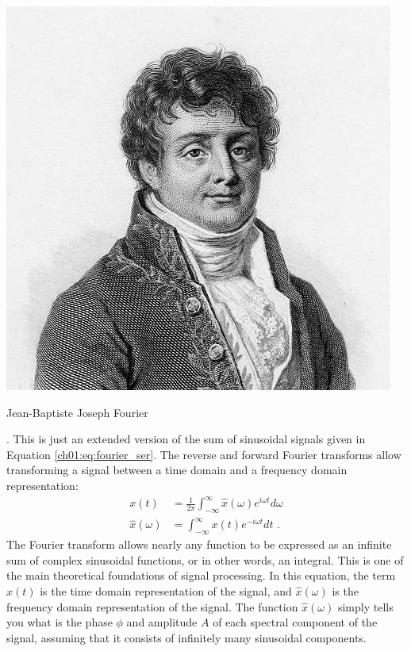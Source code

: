 \begin{marginfigure}
	\begin{center}
		\includegraphics[width=\textwidth]{ch01/figures/fourier_head.jpg}
	\end{center}
	\caption{Jean-Baptiste Joseph Fourier}
	\label{fig:joe_fourier}
\end{marginfigure}

.
This is just an extended version of the sum of sinusoidal signals given in Equation \ref{ch01:eq:fourier_ser}. The
reverse and forward Fourier transforms allow transforming a signal
between a time domain and a frequency domain representation:
\begin{align}
	x(t)            & = \frac{1}{2\pi}\int_{-\infty}^{\infty} \hat{x}(\omega) e^{i\omega t} d\omega \\
	\hat{x}(\omega) & = \int_{-\infty}^{\infty} x(t) e^{-i\omega t} dt \,\,.
\end{align}
The Fourier transform allows nearly any function to be expressed as an
infinite sum of complex sinusoidal functions, or in other words, an
integral. This is one of the main theoretical foundations of signal
processing. In this equation, the term $x(t)$ is the time domain
representation of the signal, and $\hat{x}(\omega)$ is the frequency
domain representation of the signal. The function $\hat{x}(\omega)$
simply tells you what is the phase $\phi$ and amplitude $A$ of
each spectral component of the signal, assuming that it consists of
infinitely many sinusoidal components.

